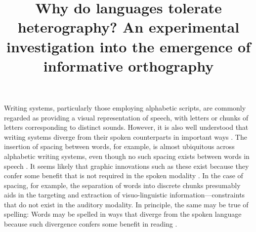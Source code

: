 \documentclass[doc,biblatex]{apa7}
\title{Why do languages tolerate heterography? An experimental investigation into the emergence of informative orthography}
\begin{document}
\maketitle

\noindent
Writing systems, particularly those employing alphabetic scripts, are commonly regarded as providing a visual representation of speech, with letters or chunks of letters corresponding to distinct sounds. However, it is also well understood that writing systems diverge from their spoken counterparts in important ways \parencite{Biber:1988, Bolinger:1946, Coulmas:1991}. The insertion of spacing between words, for example, is almost ubiquitous across alphabetic writing systems, even though no such spacing exists between words in speech \parencite{Parkes:1992, Saenger:1997}. It seems likely that graphic innovations such as these exist because they confer some benefit that is not required in the spoken modality \parencite{Rastle:2019}. In the case of spacing, for example, the separation of words into discrete chunks presumably aids in the targeting and extraction of visuo-linguistic information---constraints that do not exist in the auditory modality. In principle, the same may be true of spelling: Words may be spelled in ways that diverge from the spoken language because such divergence confers some benefit in reading \parencite{Ulicheva:2020}.
\end{document}
